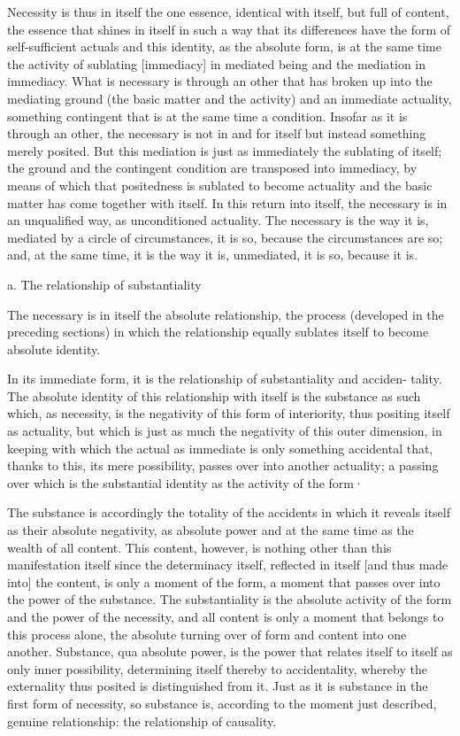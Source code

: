Necessity is thus in itself the one essence,
identical with itself, but full of content,
the essence that shines in itself in such a way
that its differences have the form of self-sufficient actuals
and this identity, as the absolute form, is at the same time
the activity of sublating [immediacy] in mediated being and
the mediation in immediacy.
What is necessary is through an other that has broken up
into the mediating ground (the basic matter and the activity)
and an immediate actuality,
something contingent that is at the same time a condition.
Insofar as it is through an other, the necessary is
not in and for itself but instead something merely posited.
But this mediation is just as immediately the sublating of itself;
the ground and the contingent condition are transposed into immediacy,
by means of which that positedness is sublated to become actuality and
the basic matter has come together with itself.
In this return into itself, the necessary is
in an unqualified way, as unconditioned actuality.
The necessary is the way it is, mediated by a circle of circumstances,
it is so, because the circumstances are so;
and, at the same time, it is the way it is, unmediated,
it is so, because it is.

a. The relationship of substantiality

The necessary is in itself the absolute relationship,
the process (developed in the preceding sections) in which
the relationship equally sublates itself to become absolute identity.

In its immediate form, it is the relationship of substantiality and acciden-
tality. The absolute identity of this relationship with itself is the substance
as such which, as necessity, is the negativity of this form of interiority, thus
positing itself as actuality, but which is just as much the negativity of this
outer dimension, in keeping with which the actual as immediate is only
something accidental that, thanks to this, its mere possibility, passes over
into another actuality; a passing over which is the substantial identity as the
activity of the form·

The substance is accordingly the totality of the accidents in which it reveals
itself as their absolute negativity, as absolute power and at the same time
as the wealth of all content. This content, however, is nothing other than
this manifestation itself since the determinacy itself, reflected in itself [and
thus made into] the content, is only a moment of the form,
a moment that passes over into the power of the substance.
The substantiality is the
absolute activity of the form and the power of the necessity, and all content
is only a moment that belongs to this process alone,
the absolute turning over of form and content into one another.
Substance, qua absolute power, is the power that
relates itself to itself as only inner possibility,
determining itself thereby to accidentality,
whereby the externality thus posited is distinguished from it.
Just as it is substance in the first form of necessity,
so substance is, according to the moment just described,
genuine relationship: the relationship of causality.

